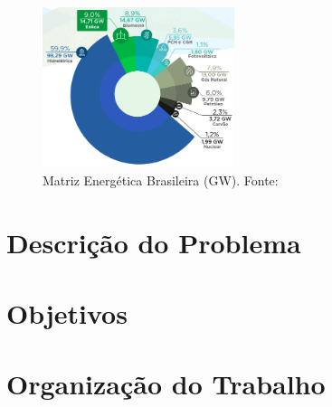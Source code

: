 
\begin{figure}[!hbt]
	\begin{center}
    \includegraphics[width=0.5\textwidth]{figuras/matriz_eletrica_brasileira.png}
    \caption{Matriz Energética Brasileira (GW). Fonte: \cite{ABEeolica}}
    \label{fig:matriz-energetica-brasileira}
    \end{center}
\end{figure}

\section{Descrição do Problema}


\section{Objetivos}

\section{Organização do Trabalho}


